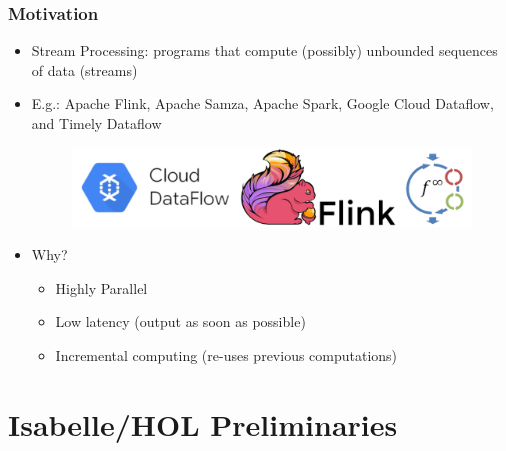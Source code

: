 \documentclass[aspectratio=169,10pt]{beamer}
\begin{document}
\begin{frame}[fragile]
  \frametitle{Motivation}
  \begin{itemize}
    \item Stream Processing: programs that compute (possibly) unbounded sequences of data (streams)
    \item E.g.: Apache Flink, Apache Samza, Apache Spark, Google Cloud Dataflow, and Timely Dataflow
          \begin{figure}
            \centering
            \includegraphics[scale=0.1]{all}
          \end{figure}
    \item Why?
          \begin{itemize}
            \item Highly Parallel
            \item Low latency (output as soon as possible)
            \item Incremental computing (re-uses previous computations)
          \end{itemize}
  \end{itemize}
\end{frame}

\section{Isabelle/HOL Preliminaries}
\end{document}
